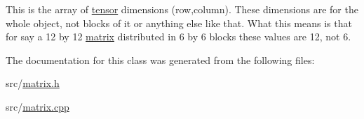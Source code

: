 This is the array of \hyperlink{classJKBuilder_1_1tensor}{tensor} dimensions (row,column). These dimensions are for the whole object, not blocks of it or anything else like that. What this means is that for say a 12 by 12 \hyperlink{classJKBuilder_1_1matrix}{matrix} distributed in 6 by 6 blocks these values are 12, not 6. 

The documentation for this class was generated from the following files:\begin{DoxyCompactItemize}
\item 
src/\hyperlink{matrix_8h}{matrix.h}\item 
src/\hyperlink{matrix_8cpp}{matrix.cpp}\end{DoxyCompactItemize}
